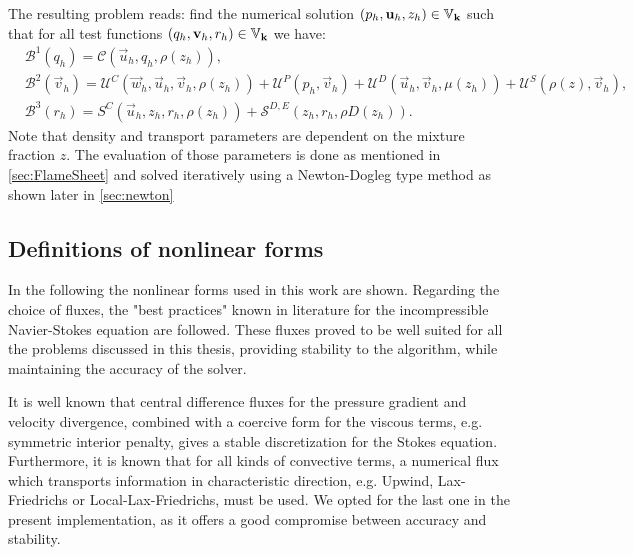 The resulting problem reads: find the numerical solution $(p_h,\textbf{u}_h,z_h)\in \mathbb{V}_{\textbf{k}}$ such that for all test functions $(q_h,\textbf{v}_h,r_h)\in \mathbb{V}_{\textbf{k}}$ we have:
\begin{subequations}
	\begin{flalign}
		&\mathcal{B}^1(q_h)=\mathcal{C}\left(\vec{u}_h,q_h, \rho(z_h)\right),& \label{DiscretizedConti2}\\
		&\mathcal{B}^2(\vec{v}_h) =\mathcal{U}^C\left(\vec{w}_h,\vec{u}_h,\vec{v}_h, \rho(z_h)\right)+ 	\mathcal{U}^P\left(p_h,\vec{v}_h\right) +\mathcal{U}^D\left(\vec{u}_h,\vec{v}_h,\mu(z_h)\right) +\mathcal{U}^S\left(\rho(z), \vec{v}_h\right),& \label{DiscretizedMomentum2}\\
		&\mathcal{B}^3(r_h) = {S}^C\left(\vec{u}_h,z_h,r_h, \rho(z_h)\right) + \mathcal{S}^{D,E}\left(z_h,r_h,\rho D(z_h)\right).& \label{DiscretizedEnergy2}
	\end{flalign}\label{eqs:variatFS}
\end{subequations}
Note that density and transport parameters are dependent on the mixture fraction $z$. The evaluation of those parameters is done as mentioned in \cref{sec:FlameSheet} and solved iteratively using a Newton-Dogleg type method as shown later in \cref{sec:newton}
\subsection{Definitions of nonlinear forms}\label{ssec:nonLinearforms}
In the following the nonlinear forms used in this work are shown. Regarding the choice of fluxes, the "best practices" known in literature for the incompressible Navier-Stokes equation are followed. These fluxes proved to be well suited for all the problems discussed in this thesis, providing stability to the algorithm, while maintaining the accuracy of the solver.

It is well known \parencite{pietroMathematicalAspectsDiscontinuous2012,giraultDiscontinuousGalerkinMethod2004} that central difference fluxes for the pressure gradient and velocity divergence, combined with a coercive form for the viscous terms, e.g. symmetric interior penalty, gives a stable discretization for the Stokes equation. Furthermore, it is known that for all kinds of convective terms, a numerical flux which transports information in characteristic direction, e.g. Upwind, Lax-Friedrichs or Local-Lax-Friedrichs, must be used. We opted for the last one in the present implementation, as it offers a good compromise between accuracy and stability.
